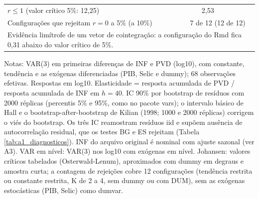 \begin{table}[htbp]
\begin{tabular}{lcc}
$r \leq 1$ (valor cr\'itico 5\%: 12{,}25) & 2{,}53 & \\
Configura\c{c}\~oes que rejeitam $r = 0$ a 5\% (a 10\%) & \multicolumn{2}{c}{7 de 12 (12 de 12)} \\
\multicolumn{3}{l}{\quad \footnotesize Evid\^encia lim\'itrofe de um vetor de cointegra\c{c}\~ao: a configura\c{c}\~ao do Rmd fica 0{,}31 abaixo do valor cr\'itico de 5\%.} \\
\bottomrule
\end{tabular}
\begin{minipage}{0.95\linewidth}\footnotesize
\medskip Notas: VAR(3) em primeiras diferen\c{c}as de INF e PVD (log10), com constante, tend\^encia e as ex\'ogenas diferenciadas (PIB, Selic e dummy); 68 observa\c{c}\~oes efetivas. Respostas em log10. Elasticidade = resposta acumulada de PVD / resposta acumulada de INF em $h = 40$. IC 90\% por bootstrap de res\'iduos com 2000 r\'eplicas (percentis 5\% e 95\%, como no pacote vars); o intervalo b\'asico de Hall e o bootstrap-after-bootstrap de Kilian (1998; 1000 e 2000 r\'eplicas) corrigem o vi\'es do bootstrap. Os tr\^es IC reamostram res\'iduos iid e sup\~oem aus\^encia de autocorrela\c{c}\~ao residual, que os testes BG e ES rejeitam (Tabela \ref{tab:a1_diagnosticos}). INF do arquivo original \'e nominal com ajuste sazonal (ver A3). VAR em n\'ivel: VAR(3) nos log10 com ex\'ogenas em n\'ivel. Johansen: valores cr\'iticos tabelados (Osterwald-Lenum), aproximados com dummy em degraus e amostra curta; a contagem de rejei\c{c}\~oes cobre 12 configura\c{c}\~oes (tend\^encia restrita ou constante restrita, K de 2 a 4, sem dummy ou com DUM), sem as ex\'ogenas estoc\'asticas (PIB, Selic) como dumvar.
\end{minipage}
\end{table}

